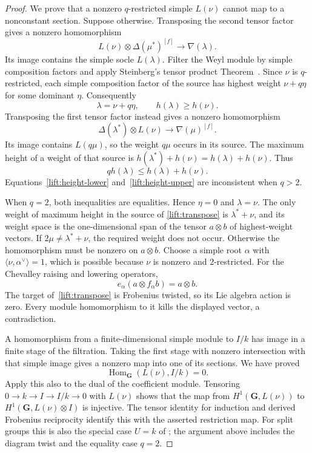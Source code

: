 \begin{proof}
We prove that a nonzero $q$-restricted simple $L(\nu)$ cannot map to a
nonconstant section.  Suppose otherwise.  Transposing the second tensor
factor gives a nonzero homomorphism
\[
 L(\nu)\otimes\Delta(\mu^*)^{[f]}
       \longrightarrow\nabla(\lambda).
\]
Its image contains the simple socle $L(\lambda)$.  Filter the Weyl module
by simple composition factors and apply Steinberg's tensor product
Theorem~\cite[Theorems~5.1 and~6.1]{Steinberg1963}.  Since $\nu$ is $q$-restricted, each simple
composition factor of the source has highest weight $\nu+q\eta$ for
some dominant $\eta$.  Consequently
\begin{equation}\label{lift:height-lower}
 \lambda=\nu+q\eta,\qquad h(\lambda)\geq h(\nu).
\end{equation}
Transposing the first tensor factor instead gives a nonzero homomorphism
\begin{equation}\label{lift:transpose}
 \Delta(\lambda^*)\otimes L(\nu)
       \longrightarrow\nabla(\mu)^{[f]}.
\end{equation}
Its image contains $L(q\mu)$, so the weight $q\mu$ occurs in its source.
The maximum height of a weight of that source is
$h(\lambda^*)+h(\nu)=h(\lambda)+h(\nu)$.  Thus
\begin{equation}\label{lift:height-upper}
 qh(\lambda)\leq h(\lambda)+h(\nu).
\end{equation}
Equations~\eqref{lift:height-lower} and~\eqref{lift:height-upper} are
inconsistent when $q>2$.

When $q=2$, both inequalities are equalities.  Hence $\eta=0$ and
$\lambda=\nu$.  The only weight of maximum height in the source of
\eqref{lift:transpose} is $\lambda^*+\nu$, and its weight space is the
one-dimensional span of the tensor $a\otimes b$ of highest-weight
vectors.  If $2\mu\neq\lambda^*+\nu$, the required weight does not
occur.  Otherwise the homomorphism must be nonzero on $a\otimes b$.
Choose a simple root $\alpha$ with
$\langle\nu,\alpha^\vee\rangle=1$, which is possible because $\nu$ is
nonzero and $2$-restricted.  For the Chevalley raising and lowering
operators,
\[
 e_\alpha(a\otimes f_\alpha b)=a\otimes b.
\]
The target of~\eqref{lift:transpose} is Frobenius twisted, so its Lie
algebra action is zero.  Every module homomorphism to it kills the
displayed vector, a contradiction.

A homomorphism from a finite-dimensional simple module to $I/k$ has
image in a finite stage of the filtration.  Taking the first stage with
nonzero intersection with that simple image gives a nonzero map into
one of its sections.  We have proved
\[
 \operatorname{Hom}_{\mathbf G}(L(\nu),I/k)=0.
\]
Apply this also to the dual of the coefficient module.  Tensoring
$0\to k\to I\to I/k\to0$ with $L(\nu)$ shows that the map from
$H^1(\mathbf G,L(\nu))$ to $H^1(\mathbf G,L(\nu)\otimes I)$ is
injective.  The tensor identity for induction and derived Frobenius
reciprocity identify this with the asserted restriction map.  For split
groups this is also the special case $U=k$ of
\cite[Theorem~7.4]{CPSvdK1977}; the argument above includes the diagram
twist and the equality case $q=2$.
\end{proof}

